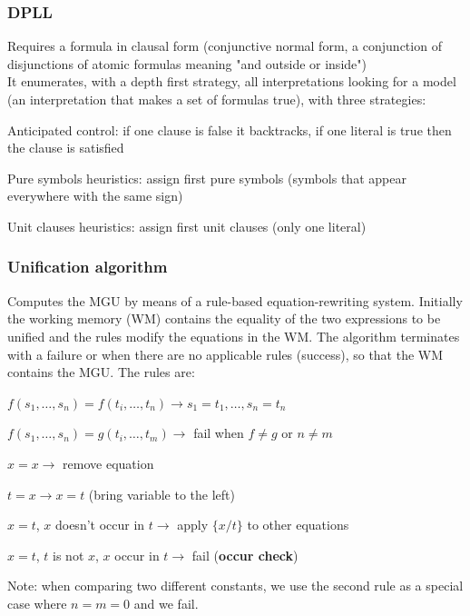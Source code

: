 \documentclass[10pt]{report}
\begin{document}
\subsubsection{DPLL} Requires a formula in clausal form (conjunctive normal form, a conjunction of disjunctions of atomic formulas meaning "and outside or inside")\\
It enumerates, with a depth first strategy, all interpretations looking for a model (an interpretation that makes a set of formulas true), with three strategies:
\begin{list}{}{}
	\item Anticipated control: if one clause is false it backtracks, if one literal is true then the clause is satisfied
	\item Pure symbols heuristics: assign first pure symbols (symbols that appear everywhere with the same sign)
	\item Unit clauses heuristics: assign first unit clauses (only one literal)
\end{list}
\subsubsection{Unification algorithm} Computes the MGU by means of a rule-based equation-rewriting system. Initially the working memory (WM) contains the equality of the two expressions to be unified and the rules modify the equations in the WM. The algorithm terminates with a failure or when there are no applicable rules (success), so that the WM contains the MGU. The rules are:
\begin{list}{}{}
	\item $f(s_1,\ldots,s_n)=f(t_i,\ldots,t_n) \rightarrow s_1 = t_1, \ldots, s_n= t_n$
	\item $f(s_1,\ldots,s_n)=g(t_i,\ldots,t_m) \rightarrow$ fail when $f\neq g$ or $n\neq m$
	\item $x = x \rightarrow$ remove equation
	\item $t = x \rightarrow x = t$ (bring variable to the left)
	\item $x = t$, $x$ doesn't occur in $t \rightarrow$ apply $\{x/t\}$ to other equations
	\item $x = t$, $t$ is not $x$, $x$ occur in $t\rightarrow$ fail (\textbf{occur check})
\end{list}
Note: when comparing two different constants, we use the second rule as a special case where $n=m=0$ and we fail.
\end{document}
